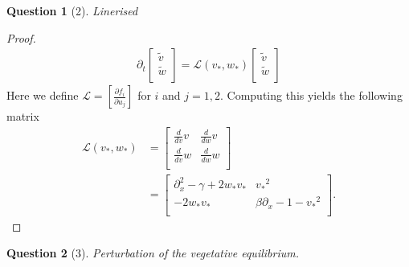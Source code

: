 \documentclass[11pt]{article}
\theoremstyle{quest}
\newtheorem*{question}{Question}
\newcommand{\Dp}{\partial}
\begin{document}
\begin{question}[2]
    Linerised 
\end{question}
\begin{proof}
    \begin{align*}
        \Dp_t
        \begin{bmatrix}
            \tilde{v} \\
            \tilde{w} \\
        \end{bmatrix}  = 
        \mathcal{L} \left( v_*, w_* \right)
        \begin{bmatrix}
            \tilde{v} \\
            \tilde{w} \\
        \end{bmatrix}   
    \end{align*}
    Here we define $\mathcal{L} = \left[ \frac{\Dp f_i }{ \Dp u_j } \right]$ for $i$ and $j=1,2$. 
    Computing this yields the following matrix 
    \begin{align*}
        \mathcal{L} \left( v_*, w_* \right)  &=
        \begin{bmatrix}
            \frac{d}{dv} v & \frac{d}{dw} v \\
            \frac{d}{dv} w & \frac{d}{dw} w \\
        \end{bmatrix} \\
        &=
        \begin{bmatrix}
            \Dp_{x}^{2} - \gamma + 2 w_* v_* & {v_*}^2 \\
            -2w_* v_* & \beta \Dp_x -1 - {v_*}^2 \\
        \end{bmatrix}
        .
    \end{align*}
\end{proof}
\clearpage
\begin{question}[3]
    Perturbation of the vegetative equilibrium. 
\end{question}
\end{document}
